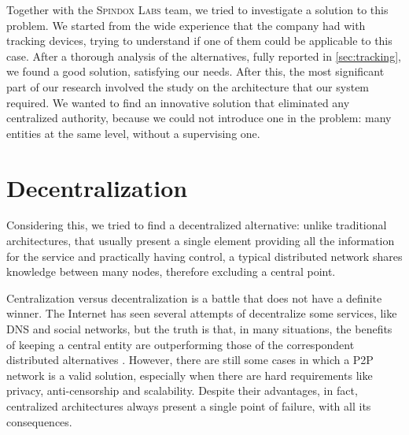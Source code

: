 Together with the \textsc{Spindox Labs} team, we tried to investigate a solution to this problem. We started from the wide experience that the company had with tracking devices, trying to understand if one of them could be applicable to this case. After a thorough analysis of the alternatives, fully reported in \ref{sec:tracking}, we found a good solution, satisfying our needs. After this, the most significant part of our research involved the study on the architecture that our system required. We wanted to find an innovative solution that eliminated any centralized authority, because we could not introduce one in the problem: many entities at the same level, without a supervising one. 

\section{Decentralization}
\label{sec:decentralization}

Considering this, we tried to find a decentralized alternative: unlike traditional architectures, that usually present a single element providing all the information for the service and practically having control, a typical distributed network shares knowledge between many nodes, therefore excluding a central point.

Centralization versus decentralization is a battle that does not have a definite winner. The Internet has seen several attempts of decentralize some services, like DNS and social networks, but the truth is that, in many situations, the benefits of keeping a central entity are outperforming those of the correspondent distributed alternatives \cite{Montresor_Permissionless}. However, there are still some cases in which a P2P network is a valid solution, especially when there are hard requirements like privacy, anti-censorship and scalability. Despite their advantages, in fact, centralized architectures always present a single point of failure, with all its consequences.

